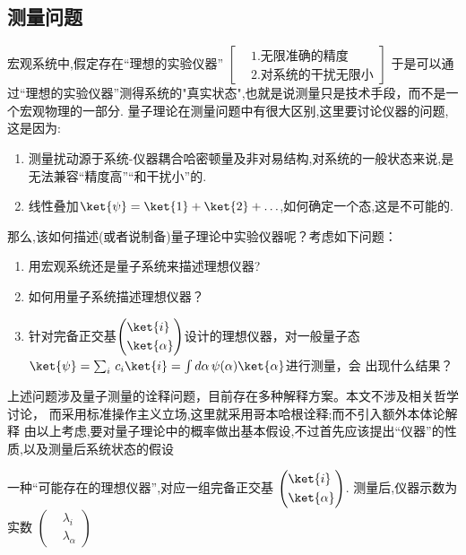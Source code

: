 \subsection{测量问题}
宏观系统中,假定存在“理想的实验仪器”
$\left[
    \begin{aligned}
        &\text{1.无限准确的精度} \\
        &\text{2.对系统的干扰无限小}
    \end{aligned}
\right]$
于是可以通过“理想的实验仪器”测得系统的"真实状态",也就是说测量只是技术手段，而不是一个宏观物理的一部分.
量子理论在测量问题中有很大区别,这里要讨论仪器的问题,这是因为:
\begin{enumerate}
    \item {}测量扰动源于系统-仪器耦合哈密顿量及非对易结构,对系统的一般状态来说,是无法兼容“精度高”“和干扰小”的.
    \item {}线性叠加$\ket{\psi}=\ket{1}+\ket{2}+\ldots$,如何确定一个态,这是不可能的.
\end{enumerate}
那么,该如何描述(或者说制备)量子理论中实验仪器呢？考虑如下问题：
\begin{enumerate}
    \item 用宏观系统还是量子系统来描述理想仪器?
    \item 如何用量子系统描述理想仪器？
    \item 针对完备正交基$\left(\begin{aligned}
        &\ket{i}\\&\ket{\alpha}
    \end{aligned}\right)$设计的理想仪器，对一般量子态 $\ket{\psi}=\sum_{i}\,c_i \ket{i}=\int d\alpha\,\psi(\alpha)\ket{\alpha}$进行测量，会
出现什么结果？
\end{enumerate}
\color{blue} 上述问题涉及量子测量的诠释问题，目前存在多种解释方案。本文不涉及相关哲学讨论，
而采用标准操作主义立场,这里就采用哥本哈根诠释;而不引入额外本体论解释\normalcolor
由以上考虑,要对量子理论中的概率做出基本假设,不过首先应该提出“仪器”的性质,以及测量后系统状态的假设
\vspace{2ex}\par
一种“可能存在的理想仪器”,对应一组完备正交基
$\left(\begin{aligned}
        &\ket{i}\\&\ket{\alpha}
\end{aligned}\right)$.
测量后,仪器示数为实数
    $\left(\begin{aligned}
        &\lambda_i\\&\lambda_\alpha
    \end{aligned}\right)$
